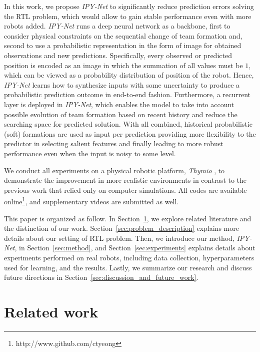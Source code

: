 \documentclass[letterpaper, 10 pt, conference]{ieeeconf}  %
\begin{document}
	In this work, we propose \emph{IPY-Net} to significantly reduce prediction errors solving 
	the RTL problem, which would allow to gain stable performance even with more robots added. 
	\emph{IPY-Net} runs a deep neural network as a backbone, 
	first to consider physical constraints on the sequential change of team formation and, 
	second to use a probabilistic representation in the form of image for obtained observations and 
	new predictions. Specifically, every observed or predicted position is 
	encoded as an image in which the summation of all values must be $1$, which can be
	viewed as a probability distribution of position of the robot. Hence,
	\emph{IPY-Net} learns how to synthesize inputs with some uncertainty to produce a probabilistic 
	prediction outcome in end-to-end fashion. Furthermore, a recurrent layer is deployed in \emph{IPY-Net}, 
	which enables the model to take into account possible evolution of 
	team formation based on recent history and reduce the searching space for predicted solution. 
	With all combined, historical probabilistic (soft) formations are used as input per prediction
	providing more flexibility to the predictor in selecting salient features and finally leading to 
	more robust performance even when the input is noisy to some level.
	
	We conduct all experiments on a physical robotic platform,
	\emph{Thymio} \cite{Shin14}, to demonstrate the improvement in more realistic environments in 
	contrast to the previous work that relied only on computer simulations. 
	All codes are available online\footnote{http://www.github.com/ctyeong}, and supplementary videos 
	are submitted as well. 
		
	This paper is organized as follow. 
	In Section~\ref{sec:related_work}, we explore related literature and the distinction of our work. 
	Section~\ref{sec:problem_description} explains more details about our setting of RTL problem. 
	Then, we introduce our method, \emph{IPY-Net}, in Section~\ref{sec:method}, and 
	Section~\ref{sec:experiments} explains details about experiments performed on real robots, 
	including data collection, hyperparameters used for learning, and the results. 
	Lastly, we summarize our research and discuss future directions 
	in Section~\ref{sec:discussion_and_future_work}.
	
	\section{Related work}
	\label{sec:related_work}
	
\end{document}
